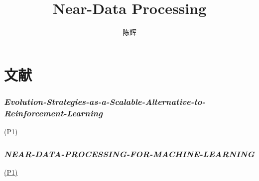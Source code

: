 \documentclass{article}
\title{Near-Data Processing}
\author{陈辉}
\date{}
\newcommand{\paper}[2]{\hyperlink{./papers/#1.pdf.#2}{(P#2)}}
\begin{document}
\maketitle
\tableofcontents
\newpage
\part{文献}
\section{\textit{Evolution-Strategies-as-a-Scalable-Alternative-to-Reinforcement-Learning}}
\paper{Evolution-Strategies-as-a-Scalable-Alternative-to-Reinforcement-Learning}{1}
\section{\textit{NEAR-DATA-PROCESSING-FOR-MACHINE-LEARNING}}
\paper{NEAR-DATA-PROCESSING-FOR-MACHINE-LEARNING}{1}





%
%
\end{document}
